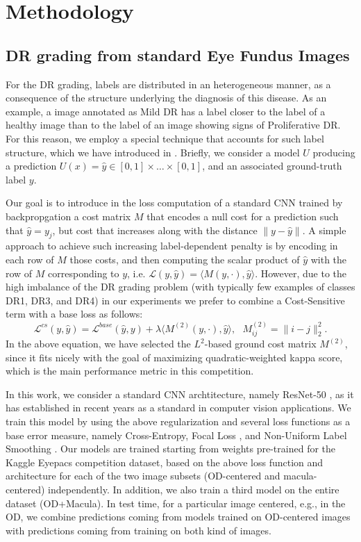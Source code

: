 \section{Methodology}
\subsection{DR grading from standard Eye Fundus Images}
For the DR grading, labels are distributed in an heterogeneous manner, as a consequence of the structure underlying the diagnosis of this disease.
As an example, a image annotated as Mild DR has a label closer to the label of a healthy image than to the label of an image showing signs of Proliferative DR.
For this reason, we employ a special technique that accounts for such label structure, which we have introduced in \cite{galdran_cost-sensitive_2020}.
Briefly, we consider a model $U$ producing a prediction $U(x)=\hat{y} \in [0,1]\times \displaystyle \ldots \times[0,1]$, and an associated ground-truth label $y$. 

Our goal is to introduce in the loss computation of a standard CNN trained by backpropgation a cost matrix $M$ that encodes a null cost for a prediction such that $\hat{y}=y_j$, but cost that increases along with the distance $\|y - \hat{y}\|$. 
A simple approach to achieve such increasing label-dependent penalty is by encoding in each row of $M$ those costs, and then computing the scalar product of $\hat{y}$ with the row of $M$ corresponding to $y$, i.e. $\mathcal{L}(y,\hat{y})=\langle M(y,\cdot), \hat{y} \rangle$. 
However, due to the high imbalance of the DR grading problem (with typically few examples of classes DR1, DR3, and DR4) in our experiments we prefer to combine a Cost-Sensitive term with a base loss as follows:
\begin{equation}\label{cs_loss}
\mathcal{L}^{cs}(y,\hat{y}) = \mathcal{L}^{base}(\hat{y},y) + \lambda \langle M^{(2)}(y,\cdot), \hat{y} \rangle, \ \ \  M^{(2)}_{ij}=\|i-j\|_2^2.
\end{equation}
In the above equation, we have selected the $L^2$-based ground cost matrix $M^{(2)}$, since it fits nicely with the goal of maximizing quadratic-weighted kappa score, which is the main performance metric in this competition.

In this work, we consider a standard CNN archtitecture, namely ResNet-50 \cite{he_deep_2016}, as it
has established in recent years as a standard in computer vision applications. 
We train this model by using the above regularization and several loss functions as a base error measure, namely Cross-Entropy, Focal Loss \cite{lin_focal_2020}, and Non-Uniform Label Smoothing \cite{galdran_non-uniform_2020}. 
Our models are trained starting from weights pre-trained for the Kaggle Eyepacs competition dataset, based on the above loss function and architecture for each of the two image subsets (OD-centered and macula-centered) independently. 
In addition, we also train a third model on the entire dataset (OD+Macula). 
In test time, for a particular image centered, e.g., in the OD, we combine predictions coming from models trained on OD-centered images with predictions coming from training on both kind of images.


